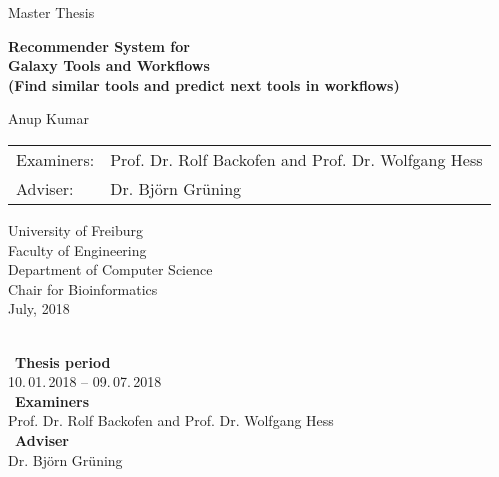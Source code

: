 \begin{titlepage}
\begin{center}

\newcommand{\HorizontalLine}{\rule{\linewidth}{0.3mm}}

{\Large Master Thesis}\\[2cm]


% 
\begin{spacing}{3}
    {\huge \bfseries Recommender System for } \\
    {\huge \bfseries Galaxy Tools and Workflows } \\
    {\Large \bfseries (Find similar tools and predict next tools in workflows) }\\[2cm]
\end{spacing}


{\Large Anup Kumar } \\[2cm]


\begin{tabular}[hc]{>{\Large}l >{\Large}l}
  Examiners: & Prof. Dr. Rolf Backofen and Prof. Dr. Wolfgang Hess \\[0.3cm]
  Adviser: & Dr. Björn Grüning \\[2cm]
  
\end{tabular}
\vfill  %

\Large {
    University of Freiburg\\
    Faculty of Engineering\\
    Department of Computer Science\\
    Chair for Bioinformatics\\[1cm]
    July, 2018
    \\
}
\end{center}
\end{titlepage}

\ \vfill \ \\  %
\
\textbf{Thesis period}            \smallskip{} \\
10.\,01.\,2018 -- 09.\,07.\,2018   \bigskip{} \\
\
\textbf{Examiners}                 \smallskip{} \\
Prof. Dr. Rolf Backofen and Prof. Dr. Wolfgang Hess               \bigskip{} \\
\
\textbf{Adviser}                   \smallskip{} \\
Dr. Björn Grüning

